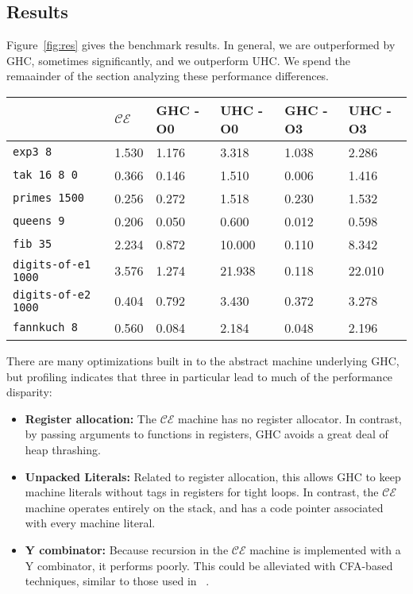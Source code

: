 \subsection{Results} \label{sec:res}

Figure~\ref{fig:res} gives the benchmark results.  In general, we are
outperformed by GHC, sometimes significantly, and we outperform UHC. We
spend the remaainder of the section analyzing these performance differences.

\begin{figure*}
\centering
\begin{tabularx}{\textwidth}{l | X | X | X | X | X}
& $\mathcal{CE}$ & GHC -O0 & UHC -O0 & GHC -O3 & UHC -O3 \\
\hline
\texttt{exp3 8} & 1.530 & 1.176 & 3.318 & 1.038 & 2.286 \\
\texttt{tak 16 8 0} & 0.366 & 0.146 & 1.510 & 0.006 & 1.416 \\
\texttt{primes 1500} & 0.256 & 0.272 & 1.518 & 0.230 & 1.532 \\
\texttt{queens 9} & 0.206 & 0.050 & 0.600 & 0.012 & 0.598 \\
\texttt{fib 35} & 2.234 & 0.872 & 10.000 & 0.110 & 8.342 \\
\texttt{digits-of-e1 1000} & 3.576 & 1.274 & 21.938 & 0.118 & 22.010 \\
\texttt{digits-of-e2 1000} & 0.404 & 0.792 & 3.430 & 0.372 & 3.278 \\
\texttt{fannkuch 8} & 0.560 & 0.084 & 2.184 & 0.048 & 2.196 \\
\end{tabularx}
\caption{Machine Literals Benchmark Results. Measurement is wall clock time,
units are seconds. Times averaged over 5 runs.}
\label{fig:res}
\end{figure*}

There are many optimizations built in to the abstract machine underlying GHC,
but profiling indicates that three in particular lead to much of the performance
disparity: 

\begin{itemize}
\item \textbf{Register allocation:} The $\mathcal{CE}$ machine has no register
allocator. In contrast, by passing arguments to functions in registers, GHC
avoids a great deal of heap thrashing.
\item \textbf{Unpacked Literals:} Related to register allocation, this allows
GHC to keep machine literals without tags in registers for tight loops. In
contrast, the $\mathcal{CE}$ machine operates entirely on the stack, and has a
code pointer associated with every machine literal. 
\item \textbf{Y combinator:} Because recursion in the $\mathcal{CE}$ machine is
implemented with a Y combinator, it performs poorly. This could be alleviated
with CFA-based techniques, similar to those used in ~\cite{rozas1992taming}. 
\end{itemize}

